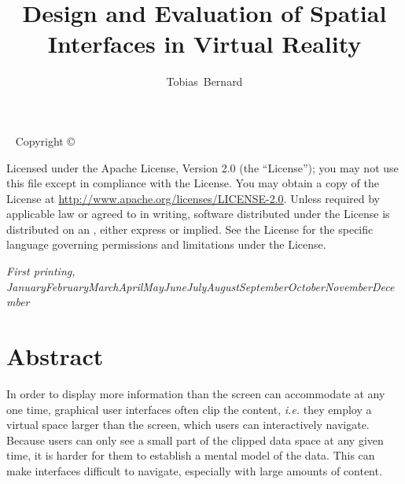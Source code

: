 \documentclass[nobib]{tufte-book} %
\title{Design and Evaluation of Spatial Interfaces in Virtual Reality} %
\author[Tobias Bernard]{Tobias\ Bernard} %
\newcommand{\monthyear}{\ifcase\month\or January\or February\or March\or April\or May\or June\or July\or August\or September\or October\or November\or December\fi\space\number\year} %
\newcommand{\hairsp}{\hspace{1pt}} %
\newcommand{\ie}{\textit{i.\hairsp{}e.}\xspace} %
\begin{document}
\frontmatter



\maketitlepage %


\newpage
\begin{fullwidth}
~\vfill
\thispagestyle{empty}
\setlength{\parindent}{0pt}
\setlength{\parskip}{\baselineskip}
Copyright \copyright\ \the\year\ \thanklessauthor

\par{}

\par{}

\par Licensed under the Apache License, Version 2.0 (the ``License''); you may not use this file except in compliance with the License. You may obtain a copy of the License at \url{http://www.apache.org/licenses/LICENSE-2.0}. Unless required by applicable law or agreed to in writing, software distributed under the License is distributed on an , either express or implied. See the License for the specific language governing permissions and limitations under the License.

\par\textit{First printing, \monthyear}
\end{fullwidth}


\tableofcontents %


\mainmatter


\chapter{Abstract}

In order to display more information than the screen can accommodate at any one time, graphical user interfaces often clip the content, \ie they employ a virtual space larger than the screen, which users can interactively navigate. Because users can only see a small part of the clipped data space at any given time, it is harder for them to establish a mental model of the data. This can make interfaces difficult to navigate, especially with large amounts of content.
\end{document}
